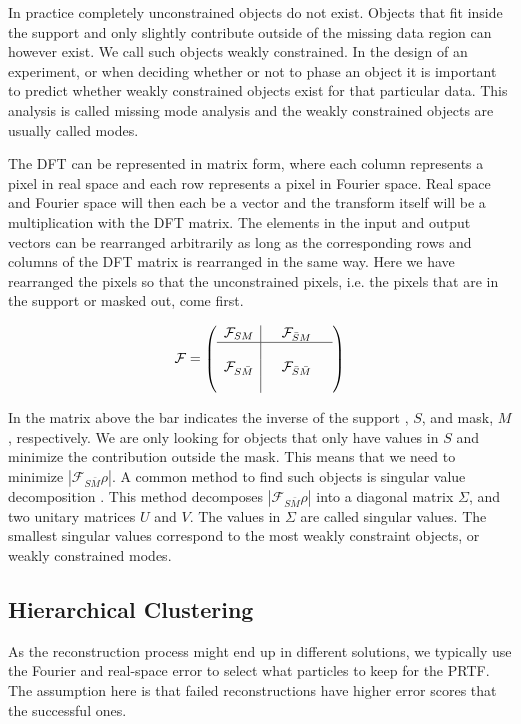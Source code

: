 In practice completely unconstrained objects do not exist. Objects that fit inside the support and only slightly contribute outside of the missing data region can however exist. We call such objects weakly constrained. In the design of an experiment, or when deciding whether or not to phase an object it is important to predict whether weakly constrained objects exist for that particular data. This analysis is called missing mode analysis and the weakly constrained objects are usually called modes.

The DFT can be represented in matrix form, where each column represents a pixel in real space and each row represents a pixel in Fourier space. Real space and Fourier space will then each be a vector and the transform itself will be a multiplication with the DFT matrix. The elements in the input and output vectors can be rearranged arbitrarily as long as the corresponding rows and columns of the DFT matrix is rearranged in the same way. Here we have rearranged the pixels so that the unconstrained pixels, i.e. the pixels that are in the support or masked out, come first.


\begin{equation}\label{equ:F_split}
  \mathcal{F} = 
  \left(\begin{array}{l|lll}
    \mathcal{F}_{SM} & &\mathcal{F}_{\bar{S}M}& \\\hline
    &&&\\
    \mathcal{F}_{S\bar{M}} & & \mathcal{F}_{\bar{S}\bar{M}} &\\
    &&&
  \end{array}\right)
\end{equation}

In the matrix above the bar indicates the inverse of the support , $S$, and mask, $M$, respectively. We are only looking for objects that only have values in $S$ and minimize the contribution outside the mask. This means that we need to minimize $|\mathcal{F}_{S\bar{M}}\rho|$. A common method to find such objects is singular value decomposition \cite{Eckart1936}. This method decomposes $|\mathcal{F}_{S\bar{M}}\rho|$ into a diagonal matrix $\Sigma$, and two unitary matrices $U$ and $V$. The values in $\Sigma$ are called singular values. The smallest singular values correspond to the most weakly constraint objects, or weakly constrained modes.

\subsection{Hierarchical Clustering}
As the reconstruction process might end up in different solutions, we typically use the Fourier and real-space error to select what particles to keep for the PRTF. The assumption here is that failed reconstructions have higher error scores that the successful ones. 

